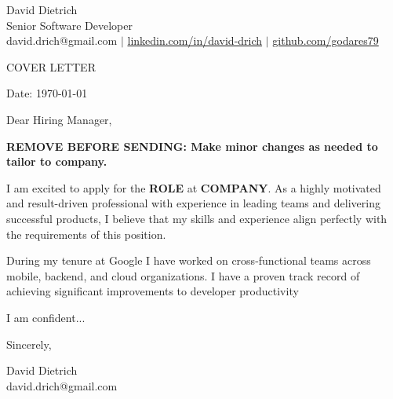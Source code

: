 \documentclass[11pt,a4]{article}
\begin{document}
\begin{center}
    
\centering
{\Huge David Dietrich} \\ %
\vspace{0.1cm}
{\color{UI_blue} \Large{Senior Software Developer}} \\
\vspace{0.1cm}
\large david.drich@gmail.com 
$\vert$
\large {\href{https://www.linkedin.com/in/david-drich/}{linkedin.com/in/david-drich} }
$\vert$
\large {\href{https://github.com/godares79}{github.com/godares79}}

\vspace{-0.15cm} 
{\color{UI_blue} \hrulefill}
\end{center}

\justify
\setlength{\parindent}{0pt}
\setlength{\parskip}{12pt}
\vspace{0.2cm}
\begin{center}
    {\color{UI_blue} \Large{COVER LETTER}}
\end{center}



Date: \today \par \vspace{-0.1cm}
Dear Hiring Manager, %

\textbf{REMOVE BEFORE SENDING: Make minor changes as needed to tailor to company.}

I am excited to apply for the \textbf{ROLE} at \textbf{COMPANY}. As a highly motivated and result-driven professional with experience in leading teams and delivering successful products, I believe that my skills and experience align perfectly with the requirements of this position. \par

During my tenure at Google I have worked on cross-functional teams across mobile, backend, and cloud organizations. I have a proven track record of achieving significant improvements to developer productivity

I am confident... \par


\vspace{0.5cm}
\raggedright
Sincerely, \\
\vspace{0.2cm}
\raggedright
David Dietrich \\ david.drich@gmail.com
\end{document}
